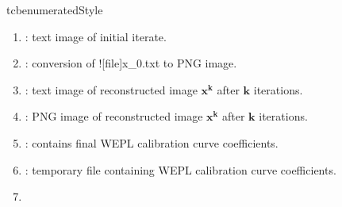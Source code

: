 \begin{tcbenvironment}
\begin{tcbparbox}{tcbenumeratedStyle}
\begin{enumerate}
    \item {} : text image of initial iterate.
    \item {} : conversion of \docentry![file]{x\_0.txt} to PNG image.
    \item {} : text image of reconstructed image $\boldsymbol{x^k}$ after $\boldsymbol{k}$ iterations.
    \item {} : PNG image of reconstructed image $\boldsymbol{x^k}$ after $\boldsymbol{k}$ iterations.
    \item {} : contains final WEPL calibration curve coefficients.
    \item {} : temporary file containing WEPL calibration curve coefficients.
    \item {}
\end{enumerate}
\end{tcbparbox}
\end{tcbenvironment}
\endinput %
